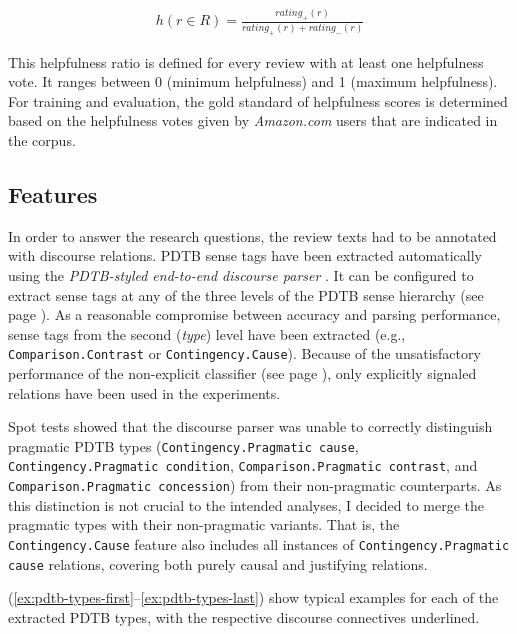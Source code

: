 \documentclass[
    a4paper,%
    12pt,%
    oneside,%
    toc=bibliography,
    final,
]{scrartcl}
\begin{document}
\vspace{-2em}

\begin{align}
\label{helpfulness-fuction}
h(r \in R) = \frac{rating_+(r)}{rating_+(r) + rating_-(r)}
\end{align}

This helpfulness ratio is defined for every review with at least one helpfulness vote. It ranges between 0 (minimum helpfulness) and 1 (maximum helpfulness). For training and evaluation, the gold standard of helpfulness scores is determined based on the helpfulness votes given by \textit{Amazon.com} users that are indicated in the corpus.

\subsection{Features}

In order to answer the research questions, the review texts had to be annotated with discourse relations. PDTB sense tags have been extracted automatically using the \textit{PDTB-styled end-to-end discourse parser} \citep{Lin2014}. It can be configured to extract sense tags at any of the three levels of the PDTB sense hierarchy (see page \pageref{fig:pdtb-sense-hierarchy}). As a reasonable compromise between accuracy and parsing performance, sense tags from the second (\textit{type}) level have been extracted (e.g., \lstinline|Comparison.Contrast| or \lstinline|Contingency.Cause|). Because of the unsatisfactory performance of the non-explicit classifier (see page \pageref{para:pdtb-parser}), only explicitly signaled relations have been used in the experiments.

\begin{sloppypar}
Spot tests showed that the discourse parser was unable to correctly distinguish pragmatic PDTB types (\lstinline|Contingency.Pragmatic cause|, \lstinline|Contingency.Pragmatic condition|, \lstinline|Comparison.Pragmatic contrast|, and \lstinline|Comparison.Pragmatic concession|) from their non-pragmatic counterparts. As this distinction is not crucial to the intended analyses, I decided to merge the pragmatic types with their non-pragmatic variants. That is, the \lstinline|Contingency.Cause| feature also includes all instances of \lstinline|Contingency.Pragmatic cause| relations, covering both purely causal and justifying relations.
\end{sloppypar}

(\ref{ex:pdtb-types-first}–\ref{ex:pdtb-types-last}) show typical examples for each of the extracted PDTB types, with the respective discourse connectives underlined.
\end{document}
